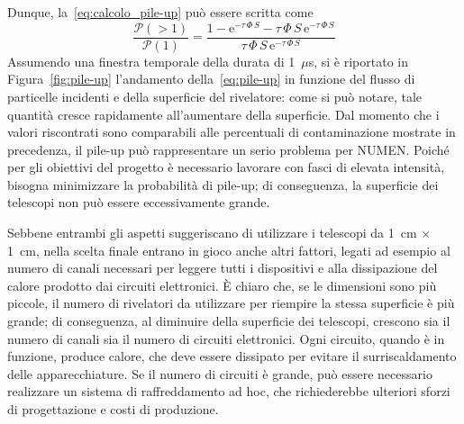 Dunque, la~\ref{eq:calcolo_pile-up} può essere scritta come
\begin{equation} \label{eq:pile-up}
\frac{\mathcal{P}(> \! 1)}{\mathcal{P}(1)} = \frac{1 - 
	\mbox{e}^{- \tau \, \Phi \, S} - \tau \, \Phi \, S \,\mbox{e}^{- \tau\, \Phi \, S}}{\tau \, \Phi \, S \, \mbox{e}^{- \tau \, \Phi \, S}}
\end{equation} 
Assumendo una finestra temporale della durata di 1~$\mu$s, si è riportato in Figura~\ref{fig:pile-up} l'andamento della~\ref{eq:pile-up} in funzione del flusso di particelle incidenti e della superficie del rivelatore: come si può notare, tale quantità cresce rapidamente all'aumentare della superficie.
Dal momento che i valori riscontrati sono comparabili alle percentuali di contaminazione mostrate in precedenza, il pile-up può rappresentare un serio problema per NUMEN.
Poiché per gli obiettivi del progetto è necessario lavorare con fasci di elevata intensità, bisogna minimizzare la probabilità di pile-up; di conseguenza, la superficie dei telescopi non può essere eccessivamente grande.






Sebbene entrambi gli aspetti suggeriscano di utilizzare i telescopi da 1~cm $\times$ 1~cm, nella scelta finale entrano in gioco anche altri fattori, legati ad esempio al numero di canali necessari per leggere tutti i dispositivi e alla dissipazione del calore prodotto dai circuiti elettronici.
È chiaro che, se le dimensioni sono più piccole, il numero di rivelatori da utilizzare per riempire la stessa superficie è più grande; di conseguenza, al diminuire della superficie dei telescopi, crescono sia il numero di canali sia il numero di circuiti elettronici.
Ogni circuito, quando è in funzione, produce calore, che deve essere dissipato per evitare il surriscaldamento delle apparecchiature.
Se il numero di circuiti è grande, può essere necessario realizzare un sistema di raffreddamento ad hoc, che richiederebbe ulteriori sforzi di progettazione e costi di produzione.

